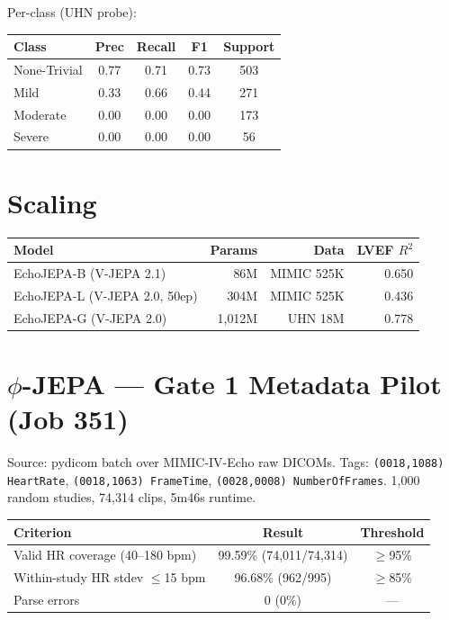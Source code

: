 \documentclass{article}
\begin{document}
Per-class (UHN probe):
\begin{center}
\begin{tabular}{lcccc}
\toprule
Class & Prec & Recall & F1 & Support \\
\midrule
None-Trivial & 0.77 & 0.71 & 0.73 & 503 \\
Mild         & 0.33 & 0.66 & 0.44 & 271 \\
Moderate     & 0.00 & 0.00 & 0.00 & 173 \\
Severe       & 0.00 & 0.00 & 0.00 & 56 \\
\bottomrule
\end{tabular}
\end{center}

\section{Scaling}

\begin{center}
\begin{tabular}{lrrr}
\toprule
Model & Params & Data & LVEF $R^2$ \\
\midrule
EchoJEPA-B (V-JEPA 2.1) & 86M & MIMIC 525K & 0.650 \\
EchoJEPA-L (V-JEPA 2.0, 50ep) & 304M & MIMIC 525K & 0.436 \\
EchoJEPA-G (V-JEPA 2.0) & 1{,}012M & UHN 18M & 0.778 \\
\bottomrule
\end{tabular}
\end{center}

\section{$\phi$-JEPA --- Gate 1 Metadata Pilot (Job 351)}

Source: pydicom batch over MIMIC-IV-Echo raw DICOMs. Tags: \texttt{(0018,1088) HeartRate}, \texttt{(0018,1063) FrameTime}, \texttt{(0028,0008) NumberOfFrames}. 1{,}000 random studies, 74{,}314 clips, 5m46s runtime.

\begin{center}
\begin{tabular}{lcc}
\toprule
Criterion & Result & Threshold \\
\midrule
Valid HR coverage (40--180 bpm) & 99.59\% (74{,}011/74{,}314) & $\geq$95\% \\
Within-study HR stdev $\leq$15 bpm & 96.68\% (962/995) & $\geq$85\% \\
Parse errors & 0 (0\%) & --- \\
\bottomrule
\end{tabular}
\end{center}
\end{document}
